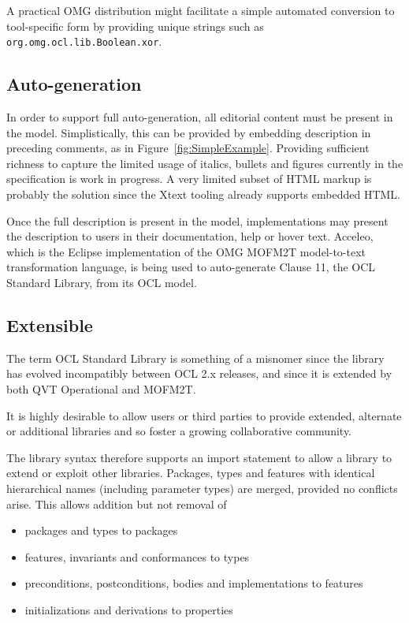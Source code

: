 \documentclass{eceasst}
\begin{document}
A practical OMG distribution might facilitate a simple automated conversion to tool-specific form by providing unique strings such as \verb|org.omg.ocl.lib.Boolean.xor|.

\subsection{Auto-generation}

In order to support full auto-generation, all editorial content must be present in the model. Simplistically, this can be provided by embedding description in preceding comments, as in Figure~\ref{fig:SimpleExample}. Providing sufficient richness to capture the limited usage of italics, bullets and figures currently in the specification is work in progress. A very limited subset of HTML markup is probably the solution since the Xtext tooling already supports embedded HTML.

Once the full description is present in the model, implementations may present the description to users in their documentation, help or hover text. Acceleo, which is the Eclipse implementation of the OMG MOFM2T model-to-text transformation language, is being used to auto-generate Clause 11, the OCL Standard Library, from its OCL model.

\subsection{Extensible}

The term OCL Standard Library is something of a misnomer since the library has evolved incompatibly between OCL 2.x releases, and since it is extended by both QVT Operational and MOFM2T.

It is highly desirable to allow users or third parties to provide extended, alternate or additional libraries and so foster a growing collaborative community.

The library syntax therefore supports an import statement to allow a library to extend or exploit other libraries. Packages, types and features with identical hierarchical names (including parameter types) are merged, provided no conflicts arise. This allows addition but not removal of

\begin{itemize}
\item packages and types to packages
\item features, invariants and conformances to types
\item preconditions, postconditions, bodies and implementations to features
\item initializations and derivations to properties
\end{itemize}
\end{document}
